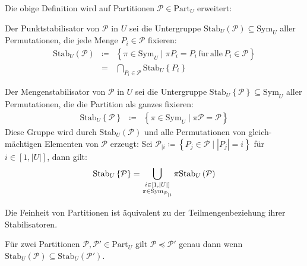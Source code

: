 \begin{defn}
Die obige Definition wird auf Partitionen $\mathcal{P}\in\mathrm{Part}_{U}$
erweitert:

Der Punktstabilisator\textbf{ }von $\mathcal{P}$ in $U$ sei die
Untergruppe $\mathrm{Stab}_{U}\left(\mathcal{P}\right)\subseteq\mathrm{Sym}_{U}$
aller Permutationen, die jede Menge $P_{i}\in\mathcal{P}$ fixieren:
\begin{eqnarray*}
\mathrm{Stab}_{U}\left(\mathcal{P}\right) & \coloneqq & \left\{ \pi\in\mathrm{Sym}_{U}\mid\pi P_{i}=P_{i}\,\mathrm{f\ddot{u}r}\,\mathrm{alle}\,P_{i}\in\mathcal{P}\right\} \\
 & = & \bigcap_{P_{i}\in\mathcal{P}}\mathrm{Stab}_{U}\left\{ P_{i}\right\} 
\end{eqnarray*}

Der Mengenstabilisator von $\mathcal{P}$ in $U$ sei die Untergruppe
$\mathrm{Stab}_{U}\left\{ \mathcal{P}\right\} \subseteq\mathrm{Sym}_{U}$
aller Permutationen, die die Partition als ganzes fixieren: 
\begin{eqnarray*}
\mathrm{Stab}_{U}\left\{ \mathcal{P}\right\}  & \coloneqq & \left\{ \pi\in\mathrm{Sym}_{U}\mid\pi\mathcal{P}=\mathcal{P}\right\} 
\end{eqnarray*}
Diese Gruppe wird durch $\mathrm{Stab}_{U}\left(\mathcal{P}\right)$
und alle Permutationen von gleich-mächtigen Elementen von $\mathcal{P}$
erzeugt: Sei $\mathcal{P}_{\mid i}\coloneqq\left\{ P_{j}\in\mathcal{P}\mid\left|P_{j}\right|=i\right\} $
für $i\in\left[1,\left|U\right|\right]$, dann gilt: 
\[
\mathrm{Stab}_{U}\left\{ \mathcal{P}\right\} =\bigcup_{\begin{subarray}{c}
i\in\left[1,\left|U\right|\right]\\
\pi\in\mathrm{Sym}_{\mathcal{P}_{\mid i}}
\end{subarray}}\pi\mathrm{Stab}_{U}\left(\mathcal{P}\right)
\]

Die Feinheit von Partitionen ist äquivalent zu der Teilmengenbeziehung
ihrer Stabilisatoren.
\end{defn}
\begin{prop}
\label{prop:feinheit-stab}Für zwei Partitionen $\mathcal{P},\mathcal{P}'\in\mathrm{Part}_{U}$
gilt $\mathcal{P}\preceq\mathcal{P}'$ genau dann wenn $\mathrm{Stab}_{U}\left(\mathcal{P}\right)\subseteq\mathrm{Stab}_{U}\left(\mathcal{P}'\right)$.
\end{prop}

